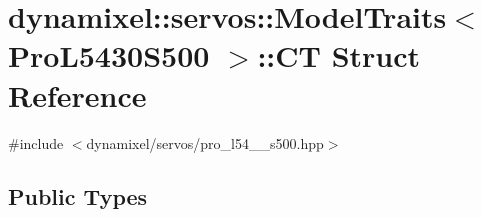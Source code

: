 \hypertarget{structdynamixel_1_1servos_1_1_model_traits_3_01_pro_l5430_s500_01_4_1_1_c_t}{}\section{dynamixel\+:\+:servos\+:\+:Model\+Traits$<$ Pro\+L5430\+S500 $>$\+:\+:C\+T Struct Reference}
\label{structdynamixel_1_1servos_1_1_model_traits_3_01_pro_l5430_s500_01_4_1_1_c_t}


{\ttfamily \#include $<$dynamixel/servos/pro\+\_\+l54\+\_\+\_\+s500.\+hpp$>$}

\subsection*{Public Types}
